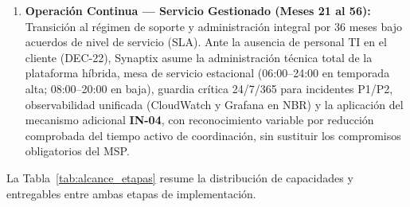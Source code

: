 \begin{enumerate}
    \item \textbf{Operación Continua --- Servicio Gestionado (Meses 21 al 56):} Transición al régimen de soporte y administración integral por 36 meses bajo acuerdos de nivel de servicio (SLA). Ante la ausencia de personal TI en el cliente (DEC-22), Synaptix asume la administración técnica total de la plataforma híbrida, mesa de servicio estacional (06:00--24:00 en temporada alta; 08:00--20:00 en baja), guardia crítica 24/7/365 para incidentes P1/P2, observabilidad unificada (CloudWatch y Grafana en NBR) y la aplicación del mecanismo adicional \textbf{IN-04}, con reconocimiento variable por reducción comprobada del tiempo activo de coordinación, sin sustituir los compromisos obligatorios del MSP.
\end{enumerate}

La Tabla~\ref{tab:alcance_etapas} resume la distribución de capacidades y entregables entre ambas etapas de implementación.

